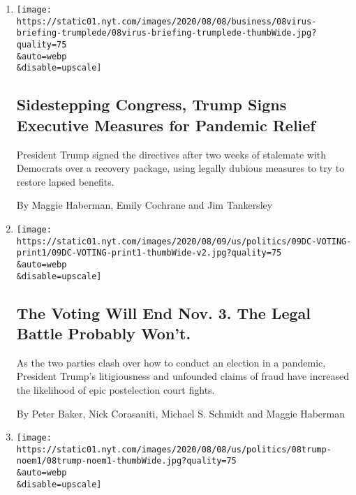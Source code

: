 \begin{enumerate}
\def\labelenumi{\arabic{enumi}.}
\item
  \href{/2020/08/08/us/politics/trump-stimulus-bill-coronavirus.html}{}

  \texttt{[image: https://static01.nyt.com/images/2020/08/08/business/08virus-briefing-trumplede/08virus-briefing-trumplede-thumbWide.jpg?quality=75\\\&auto=webp\\\&disable=upscale]}

  \hypertarget{sidestepping-congress-trump-signs-executive-measures-for-pandemic-relief}{%
  \subsection{Sidestepping Congress, Trump Signs Executive Measures for
  Pandemic
  Relief}\label{sidestepping-congress-trump-signs-executive-measures-for-pandemic-relief}}

  President Trump signed the directives after two weeks of stalemate
  with Democrats over a recovery package, using legally dubious measures
  to try to restore lapsed benefits.

  By Maggie Haberman, Emily Cochrane and Jim Tankersley
\item
  \href{/2020/08/08/us/politics/voting-nov-3-election.html}{}

  \texttt{[image: https://static01.nyt.com/images/2020/08/09/us/politics/09DC-VOTING-print1/09DC-VOTING-print1-thumbWide-v2.jpg?quality=75\\\&auto=webp\\\&disable=upscale]}

  \hypertarget{the-voting-will-end-nov-3-the-legal-battle-probably-wont}{%
  \subsection{The Voting Will End Nov. 3. The Legal Battle Probably
  Won't.}\label{the-voting-will-end-nov-3-the-legal-battle-probably-wont}}

  As the two parties clash over how to conduct an election in a
  pandemic, President Trump's litigiousness and unfounded claims of
  fraud have increased the likelihood of epic postelection court fights.

  By Peter Baker, Nick Corasaniti, Michael S. Schmidt and Maggie
  Haberman
\item
  \href{/2020/08/08/us/politics/kristi-noem-pence-trump.html}{}

  \texttt{[image: https://static01.nyt.com/images/2020/08/08/us/politics/08trump-noem1/08trump-noem1-thumbWide.jpg?quality=75\\\&auto=webp\\\&disable=upscale]}


\end{enumerate}
